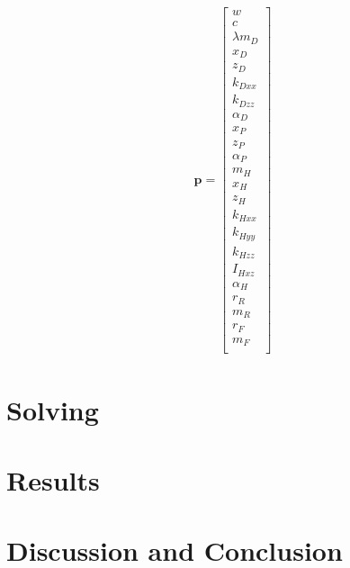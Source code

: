 \documentclass{bmd2019a}
\begin{document}
\begin{align}
  \mathbf{p} =
  \begin{bmatrix}
    w \\
    c \\
    \lambda
    m_D \\
    x_D \\
    z_D \\
    k_{Dxx} \\
    k_{Dzz} \\
    \alpha_D \\
    x_P \\
    z_P \\
    \alpha_P \\
    m_H \\
    x_H \\
    z_H \\
    k_{Hxx} \\
    k_{Hyy} \\
    k_{Hzz} \\
    I_{Hxz} \\
    \alpha_H \\
    r_R \\
    m_R \\
    r_F \\
    m_F \\
  \end{bmatrix}
\end{align}









\section*{Solving}
\section*{Results}
\section*{Discussion and Conclusion}
\end{document}
